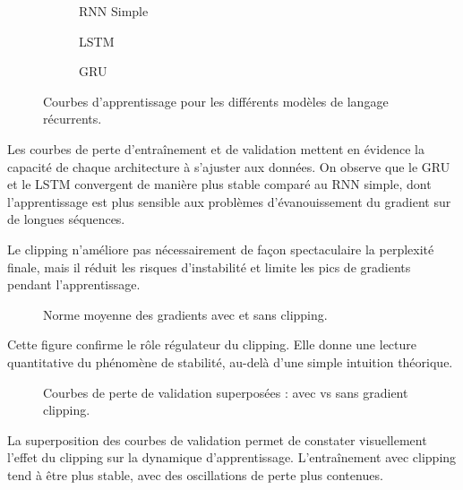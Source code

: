 \begin{figure}[H]
    \centering
    \begin{subfigure}[b]{0.32\textwidth}
        \caption{RNN Simple}
    \end{subfigure}
    \hfill
    \begin{subfigure}[b]{0.32\textwidth}
        \caption{LSTM}
    \end{subfigure}
    \hfill
    \begin{subfigure}[b]{0.32\textwidth}
        \caption{GRU}
    \end{subfigure}
    
    \caption{Courbes d'apprentissage pour les différents modèles de langage récurrents.}
\end{figure}
Les courbes de perte d'entraînement et de validation mettent en évidence la capacité de chaque architecture à s'ajuster aux données. On observe que le GRU et le LSTM convergent de manière plus stable comparé au RNN simple, dont l'apprentissage est plus sensible aux problèmes d'évanouissement du gradient sur de longues séquences.

\begin{table}[H]
    \centering
    \caption{Effet du gradient clipping sur un modèle de langage GRU.}
\end{table}
Le clipping n’améliore pas nécessairement de façon spectaculaire la perplexité finale, mais il réduit les risques d’instabilité et limite les pics de gradients pendant l’apprentissage.

\begin{figure}[H]
    \centering
    \caption{Norme moyenne des gradients avec et sans clipping.}
\end{figure}
Cette figure confirme le rôle régulateur du clipping. Elle donne une lecture quantitative du phénomène de stabilité, au-delà d’une simple intuition théorique.

\begin{figure}[H]
    \centering
    \caption{Courbes de perte de validation superposées : avec vs sans gradient clipping.}
\end{figure}
La superposition des courbes de validation permet de constater visuellement l'effet du clipping sur la dynamique d'apprentissage. L'entraînement avec clipping tend à être plus stable, avec des oscillations de perte plus contenues.

